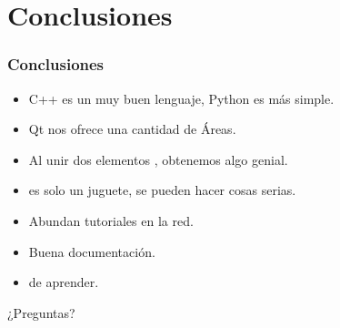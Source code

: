 \section{Conclusiones}
\frame
{
\frametitle{Conclusiones}
\begin{itemize}
	\item C++ es un muy buen lenguaje,  Python es más simple.
	\item Qt nos ofrece una  cantidad de Áreas.
	\item Al unir dos elementos , obtenemos algo genial.
	\item {} es solo un juguete, se pueden hacer cosas serias.
	\item Abundan tutoriales en la red.
	\item Buena documentación.
	\item {} de aprender.
\end{itemize}
}

\frame
{
\vspace{1cm}
\begin{center}
	\Huge{¿Preguntas?}
\end{center}
}

